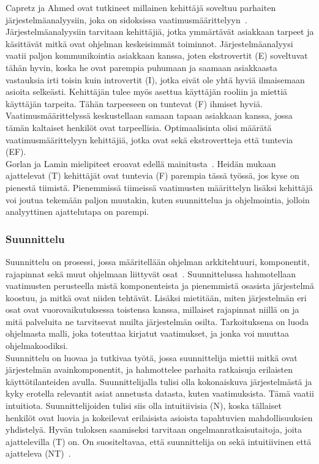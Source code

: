 \documentclass[finnish]{../tktltiki2}
\theoremstyle{definition}
\theoremstyle{remark}
\begin{document}
Capretz ja Ahmed ovat tutkineet millainen kehittäjä soveltuu
parhaiten järjestelmäanalyysiin, joka on sidoksissa vaatimusmäärittelyyn~\cite{Capretz:2010:MSS:1726559.1726574}.
Järjestelmä\-analyysiin tarvitaan kehittäjiä, jotka ymmärtävät asiakkaan tarpeet ja käsittävät mitkä ovat ohjelman keskeisimmät toiminnot.
Järjestelmäa\-nalyysi vaatii paljon kommunikointia asiakkaan kanssa,
joten ekstrovertit (E) soveltuvat tähän hyvin, koska he ovat parempia
puhumaan ja saamaan asiakkaasta vastauksia irti toisin kuin introvertit (I), jotka eivät ole yhtä hyviä ilmaisemaan asioita selkeästi. 
Kehittäjän tulee myös asettua käyttäjän rooliin ja miettiä
käyttäjän tarpeita. Tähän tarpeeseen on tuntevat (F) ihmiset hyviä. Vaatimusmäärittelyssä keskustellaan samaan tapaan asiakkaan kanssa, jossa tämän kaltaiset henkilöt ovat tarpeellisia. Optimaalisinta olisi määrätä vaatimusmäärittelyyn kehittäjiä, jotka ovat sekä ekstrovertteja että tuntevia (EF).\\

Gorlan ja Lamin mielipiteet eroavat edellä mainitusta~\cite{Gorla:2004:WWB:990680.990684}. Heidän mukaan ajattelevat (T) kehittäjät ovat tuntevia (F) parempia tässä työssä, jos kyse on pienestä tiimistä. Pienemmissä tiimeissä vaatimusten määrittelyn lisäksi kehittäjä voi joutua tekemään paljon muutakin, kuten suunnittelua ja ohjelmointia, jolloin analyyttinen ajattelutapa on parempi.

\subsubsection{Suunnittelu}

Suunnittelu on prosessi, jossa määritellään ohjelman arkkitehtuuri, komponentit, rajapinnat sekä muut ohjelmaan liittyvät osat~\cite{SWEBOK:409902}.
Suunnittelussa hahmotellaan vaatimusten perusteella mistä komponenteista ja pienemmistä osasista järjestelmä koostuu, ja mitkä ovat niiden tehtävät. Lisäksi mietitään, miten järjestelmän eri osat ovat vuorovaikutuksessa toistensa kanssa, millaiset rajapinnat niillä on ja mitä palveluita ne tarvitsevat muilta järjestelmän osilta.
Tarkoituksena on luoda ohjelmasta malli, joka toteuttaa kirjatut vaatimukset, ja jonka voi muuttaa ohjelmakoodiksi.\\

Suunnittelu on luovaa ja tutkivaa työtä, jossa suunnittelija miettii mitkä ovat järjestelmän avainkomponentit, ja hahmottelee parhaita ratkaisuja erilaisten käyttötilanteiden avulla. Suunnittelijalla tulisi olla kokonaiskuva järjestelmästä ja kyky erotella relevantit asiat annetusta datasta, kuten vaatimuksista. Tämä vaatii intuitiota.
Suunnittelijoiden tulisi siis olla intuitiivisia (N), koska tällaiset henkilöt ovat luovia ja kokeilevat erilaisista asioista tapahtuvien mahdollisuuksien yhdistelyä. Hyvän tuloksen saamiseksi tarvitaan ongelmanratkaisutaitoja, joita ajattelevilla (T) on. On suositeltavaa, että suunnittelija on sekä intuitiivinen että ajatteleva (NT)~\cite{Capretz:2010:MSS:1726559.1726574}.
\end{document}
